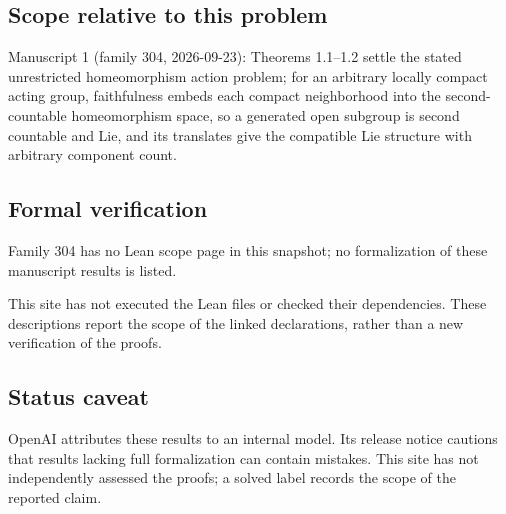 \documentclass[11pt]{article}
\begin{document}
\subsection{Scope relative to this problem}
Manuscript 1 (family 304, 2026-09-23): Theorems 1.1–1.2 settle the stated unrestricted homeomorphism action problem; for an arbitrary locally compact acting group, faithfulness embeds each compact neighborhood into the second-countable homeomorphism space, so a generated open subgroup is second countable and Lie, and its translates give the compatible Lie structure with arbitrary component count.

\subsection{Formal verification}
Family 304 has no Lean scope page in this snapshot; no formalization of these manuscript results is listed.

This site has not executed the Lean files or checked their dependencies. These descriptions report the scope of the linked declarations, rather than a new verification of the proofs.

\subsection{Status caveat}
OpenAI attributes these results to an internal model. Its release notice cautions that results lacking full formalization can contain mistakes. This site has not independently assessed the proofs; a solved label records the scope of the reported claim.
\end{document}
